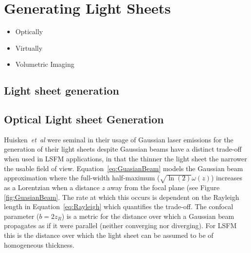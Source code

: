 


\section{Generating Light Sheets}

\begin{itemize}
	\item[\checked] Optically  %
	\item[\checked] Virtually
	\item[\checked] Volumetric Imaging
\end{itemize}	%

\subsection{Light sheet generation}
\subsection{Optical Light sheet Generation}


Huisken~\emph{et~al} were seminal in their usage of Gaussian laser emissions for the generation of their light sheets despite Gaussian beams have a distinct trade-off when used in LSFM applications, in that the thinner the light sheet the narrower the usable field of view.
Equation~\eqref{eq:GuasianBeam} models the Gaussian beam approximation where the full-width half-maximum ($\sqrt{\ln(2)}\omega(z)$) %
increases as a Lorentzian when a distance $z$ away from the focal plane (see Figure \ref{fig:GuasianBeam}.
The rate at which this occurs is dependent on the Rayleigh length in Equation~\eqref{eq:Rayleigh} which quantifies the trade-off.
The confocal parameter ($b=2z_R$) is a metric for the distance over which a Gaussian beam propagates as if it were parallel (neither converging nor diverging).
For LSFM this is the distance over which the light sheet can be assumed to be of homogeneous thickness.

